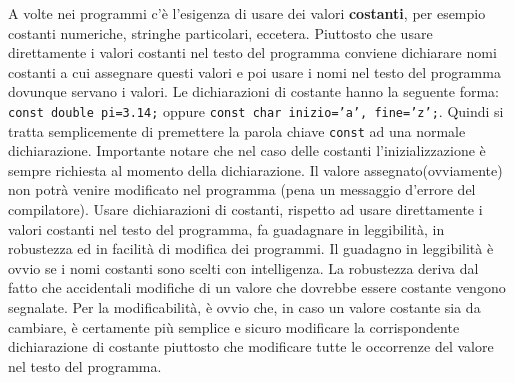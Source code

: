 A volte nei programmi c'è l'esigenza di usare dei valori \textbf{costanti}, per esempio costanti numeriche, stringhe particolari, eccetera.
Piuttosto che usare direttamente i valori costanti nel testo del programma conviene dichiarare nomi costanti a cui assegnare questi valori e poi usare i nomi nel testo del programma dovunque servano i valori.
Le dichiarazioni di costante hanno la seguente forma: \texttt{const double pi=3.14;} oppure \texttt{const char inizio='a', fine='z';}.
Quindi si tratta semplicemente di premettere la parola chiave \texttt{const} ad una normale dichiarazione.
Importante notare che nel caso delle costanti l'inizializzazione è sempre richiesta al momento della dichiarazione.
Il valore assegnato(ovviamente) non potrà venire modificato nel programma (pena un messaggio d'errore del compilatore).
Usare dichiarazioni di costanti, rispetto ad usare direttamente i valori costanti nel testo del programma, fa guadagnare in leggibilità, in robustezza ed in facilità di modifica dei programmi. Il guadagno in leggibilità è ovvio se i nomi costanti sono scelti con intelligenza.
La robustezza deriva dal fatto che accidentali modifiche di un valore che dovrebbe essere costante vengono segnalate.
Per la modificabilità, è ovvio che, in caso un valore costante sia da cambiare, è certamente più semplice e sicuro modificare la corrispondente dichiarazione di costante piuttosto che modificare tutte le occorrenze del valore nel testo del programma. 

